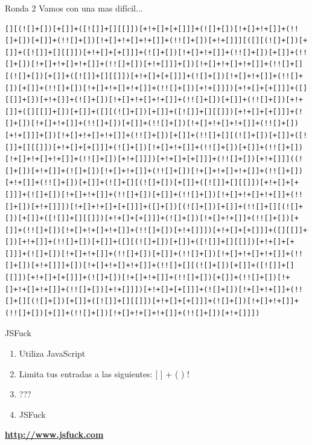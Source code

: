 \documentclass{beamer}
\begin{document}
\begin{frame}[fragile]{Ronda 2}
Vamos con una mas difícil...
\begin{lstlisting}[basicstyle=\tiny]
 [][(![]+[])[+[]]+([![]]+[][[]])[+!+[]+[+[]]]+(![]+[])[!+[]+!+[]]+(!![]+[])[+[]]+(!![]+[])[!+[]+!+[]+!+[]]+(!![]+[])[+!+[]]][([][(![]+[])[+[]]+([![]]+[][[]])[+!+[]+[+[]]]+(![]+[])[!+[]+!+[]]+(!![]+[])[+[]]+(!![]+[])[!+[]+!+[]+!+[]]+(!![]+[])[+!+[]]]+[])[!+[]+!+[]+!+[]]+(!![]+[][(![]+[])[+[]]+([![]]+[][[]])[+!+[]+[+[]]]+(![]+[])[!+[]+!+[]]+(!![]+[])[+[]]+(!![]+[])[!+[]+!+[]+!+[]]+(!![]+[])[+!+[]]])[+!+[]+[+[]]]+([][[]]+[])[+!+[]]+(![]+[])[!+[]+!+[]+!+[]]+(!![]+[])[+[]]+(!![]+[])[+!+[]]+([][[]]+[])[+[]]+([][(![]+[])[+[]]+([![]]+[][[]])[+!+[]+[+[]]]+(![]+[])[!+[]+!+[]]+(!![]+[])[+[]]+(!![]+[])[!+[]+!+[]+!+[]]+(!![]+[])[+!+[]]]+[])[!+[]+!+[]+!+[]]+(!![]+[])[+[]]+(!![]+[][(![]+[])[+[]]+([![]]+[][[]])[+!+[]+[+[]]]+(![]+[])[!+[]+!+[]]+(!![]+[])[+[]]+(!![]+[])[!+[]+!+[]+!+[]]+(!![]+[])[+!+[]]])[+!+[]+[+[]]]+(!![]+[])[+!+[]]]((![]+[])[+!+[]]+(![]+[])[!+[]+!+[]]+(!![]+[])[!+[]+!+[]+!+[]]+(!![]+[])[+!+[]]+(!![]+[])[+[]]+(![]+[][(![]+[])[+[]]+([![]]+[][[]])[+!+[]+[+[]]]+(![]+[])[!+[]+!+[]]+(!![]+[])[+[]]+(!![]+[])[!+[]+!+[]+!+[]]+(!![]+[])[+!+[]]])[!+[]+!+[]+[+[]]]+([]+[])[(![]+[])[+[]]+(!![]+[][(![]+[])[+[]]+([![]]+[][[]])[+!+[]+[+[]]]+(![]+[])[!+[]+!+[]]+(!![]+[])[+[]]+(!![]+[])[!+[]+!+[]+!+[]]+(!![]+[])[+!+[]]])[+!+[]+[+[]]]+([][[]]+[])[+!+[]]+(!![]+[])[+[]]+([][(![]+[])[+[]]+([![]]+[][[]])[+!+[]+[+[]]]+(![]+[])[!+[]+!+[]]+(!![]+[])[+[]]+(!![]+[])[!+[]+!+[]+!+[]]+(!![]+[])[+!+[]]]+[])[!+[]+!+[]+!+[]]+(!![]+[][(![]+[])[+[]]+([![]]+[][[]])[+!+[]+[+[]]]+(![]+[])[!+[]+!+[]]+(!![]+[])[+[]]+(!![]+[])[!+[]+!+[]+!+[]]+(!![]+[])[+!+[]]])[+!+[]+[+[]]]+(![]+[])[!+[]+!+[]]+(!![]+[][(![]+[])[+[]]+([![]]+[][[]])[+!+[]+[+[]]]+(![]+[])[!+[]+!+[]]+(!![]+[])[+[]]+(!![]+[])[!+[]+!+[]+!+[]]+(!![]+[])[+!+[]]])
\end{lstlisting}
    
\end{frame}

\begin{frame}{JSFuck}
\begin{enumerate}
    \item Utiliza JavaScript \pause
    \item Limita tus entradas a las siguientes: {[} {]} + {(} {)} ! \pause
    \item ??? \pause
    \item JSFuck \pause
\end{enumerate}
\centering
\textbf{\hyperlink{http://www.jsfuck.com}{http://www.jsfuck.com}} 
\end{frame}
\end{document}
